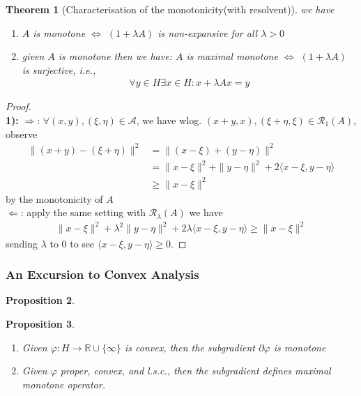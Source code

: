 \documentclass[a4paper,12pt,oneside,fleqn]{book}
\newtheorem{theorem}{Theorem}[section]
\newtheorem{proposition}[theorem]{Proposition}
\theoremstyle{definition}
\theoremstyle{remark}
\begin{document}
\begin{theorem}[Characterisation of the monotonicity(with resolvent)]
we have
\begin{enumerate}
	\item $A$ is monotone $\Leftrightarrow$ $(1 + \lambda A)$ is non-expansive for all $\lambda > 0$
	\item given $A$ is monotone then we have: $A$ is maximal monotone $\Leftrightarrow$ $( 1 + \lambda A)$ is surjective, i.e., 
	\begin{align*}
		\forall y \in H \exists x \in H: x + \lambda Ax = y
	\end{align*}
\end{enumerate}
\end{theorem}
\begin{proof}
\quad\\
\textbf{1):}
$\Rightarrow$: $\forall (x, y), (\xi, \eta) \in \mathcal{A}$, we have wlog. $(x + y, x), (\xi + \eta, \xi) \in \mathcal{R}_1(A)$, observe
\begin{align*}
	\|(x + y ) - (\xi + \eta)\|^2 &= \|(x - \xi) + (y - \eta)\|^2 \\
	&= \|x - \xi\|^2 + \|y - \eta\|^2 + 2 \langle x - \xi, y - \eta\rangle \\
	&\ge \|x - \xi \|^2 
\end{align*}
by the monotonicity of $A$\\
$\Leftarrow$: apply the same setting with $\mathcal{R}_\lambda(A)$ we have
\begin{align*}
	\|x - \xi\|^2 + \lambda^2 \|y - \eta\|^2 + 2 \lambda \langle x - \xi, y - \eta \rangle \ge \|x - \xi\|^2 
\end{align*}
sending $\lambda$ to 0 to see $\langle x - \xi, y - \eta \rangle \ge 0$. 
\end{proof}


\subsubsection{An Excursion to Convex Analysis}
\begin{proposition}
	
\end{proposition}

\begin{proposition}
\quad
\begin{enumerate}
	\item Given $\varphi: H \rightarrow \mathbb{R} \cup \{\infty\}$ is convex, then the subgradient $\partial\varphi$ is monotone
	\item Given $\varphi$ proper, convex, and l.s.c., then the subgradient defines maximal monotone operator. 
\end{enumerate}
\end{proposition}
\end{document}
